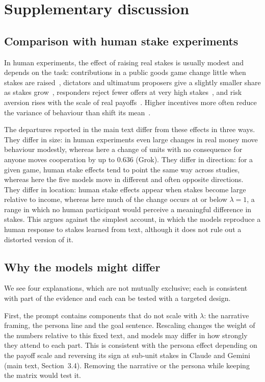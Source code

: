\documentclass[11pt,a4paper]{article}
\newcommand{\lam}{\lambda}
\newcommand{\rev}[1]{{\color{red}#1}}
\newcommand{\rev}[1]{#1}
\begin{document}
\rev{\section{Supplementary discussion}\label{appendix:discussion}

\subsection{Comparison with human stake experiments}\label{appendix:human}

In human experiments, the effect of raising real stakes is usually modest and depends on the task: contributions in a public goods game change little when stakes are raised~\cite{kocher2008does}, dictators and ultimatum proposers give a slightly smaller share as stakes grow~\cite{engel2011dictator,larney2019stake}, responders reject fewer offers at very high stakes~\cite{cameron1999raising,andersen2011stakes}, and risk aversion rises with the scale of real payoffs~\cite{holt2002risk}. Higher incentives more often reduce the variance of behaviour than shift its mean~\cite{camerer1999effects}.

The departures reported in the main text differ from these effects in three ways. They differ in size: in human experiments even large changes in real money move behaviour modestly, whereas here a change of units with no consequence for anyone moves cooperation by up to 0.636 (Grok). They differ in direction: for a given game, human stake effects tend to point the same way across studies, whereas here the five models move in different and often opposite directions. They differ in location: human stake effects appear when stakes become large relative to income, whereas here much of the change occurs at or below $\lam = 1$, a range in which no human participant would perceive a meaningful difference in stakes. This argues against the simplest account, in which the models reproduce a human response to stakes learned from text, although it does not rule out a distorted version of it.

\subsection{Why the models might differ}\label{appendix:hypotheses}

We see four explanations, which are not mutually exclusive; each is consistent with part of the evidence and each can be tested with a targeted design.

First, the prompt contains components that do not scale with $\lam$: the narrative framing, the persona line and the goal sentence. Rescaling changes the weight of the numbers relative to this fixed text, and models may differ in how strongly they attend to each part. This is consistent with the persona effect depending on the payoff scale and reversing its sign at sub-unit stakes in Claude and Gemini (main text, Section~3.4). Removing the narrative or the persona while keeping the matrix would test it.

}
\end{document}
